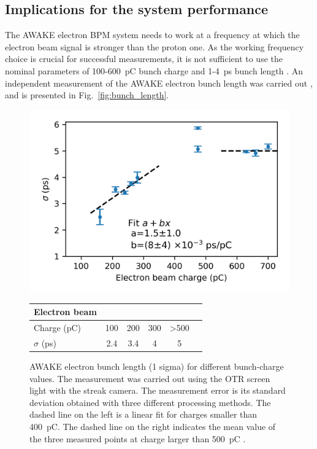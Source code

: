 \subsection[Implications for the system performance]{Implications for the system performance}

The AWAKE electron BPM system needs to work at a frequency  at which the electron beam signal is stronger than the proton one. As the working frequency choice is crucial for successful measurements, it is not sufficient to use the nominal parameters of 100-600~pC bunch charge and 1-4~ps bunch length \cite{Pepitone:2018gwl, Kim:2706086}.
An independent measurement of the AWAKE electron bunch length was carried out \cite{Mazzoni:courtesy}, and  is presented in Fig.~\ref{fig:bunch_length}. 

\begin{figure}[!t]
\centering
\includegraphics[scale=1.1, keepaspectratio]{pictures/measurement-echarge}
\caption{AWAKE electron bunch length (1 sigma) for different bunch-charge values. The measurement was carried out using the OTR screen light with the streak camera. The measurement error is its standard deviation obtained with three different processing methods. The dashed line on the left is a linear fit for charges smaller than 400~pC. The dashed line on the right indicates the mean value of the three measured points at charge larger than 500~pC \cite{Mazzoni:courtesy}.}
\label{fig:bunch_length}

\vspace{3mm}

\begin{tabular}{l c c c c c }
\toprule
Electron beam \\
\midrule
Charge (pC)& 100 & 200 & 300 & >500\\
$\sigma$ (ps)& 2.4 & 3.4 & 4 &	5\\
\bottomrule
\end{tabular}
 \label{tab:realistic_len}

\end{figure}
